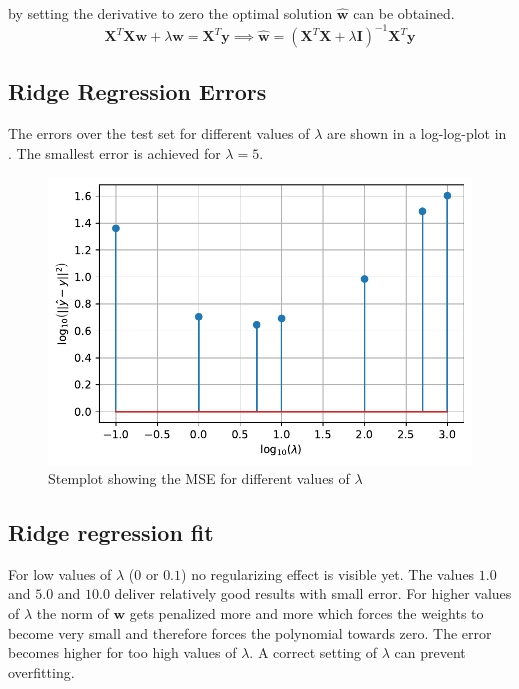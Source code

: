 \documentclass[12pt,a4paper]{scrartcl}
\newcommand{\matr}[1]{\mathbf{#1}}
\begin{document}
	by setting the derivative to zero the optimal solution $\hat{\matr{w}}$ can be obtained.
	\begin{equation}
		\matr{X}^T\matr{X}\matr{w} + \lambda \matr{w} = \matr{X}^T\matr{y} \implies \hat{\matr{w}} = (\matr{X}^T\matr{X} + \lambda \matr{I})^{-1} \matr{X}^T\matr{y}
	\end{equation}
	
	\subsection*{Ridge Regression Errors}
	
	The errors over the test set for different values of $\lambda$ are shown in a log-log-plot in . The smallest error is achieved for $\lambda = 5$.
	
	
	\begin{figure}[H]
		\centering	\includegraphics[width=0.85\linewidth]{figs/ex1_1_mse_lambda.pdf}
		\caption{Stemplot showing the MSE for different values of $\lambda$}
		\label{fig:ex1_1_mse_lambda}
	\end{figure}
	
	\subsection*{Ridge regression fit}
	
	For low values of $\lambda$ ($0$ or $0.1$) no regularizing effect is visible yet.
	The values $1.0$ and $5.0$ and $10.0$  deliver relatively good results with small error. For higher values of $\lambda$ the norm of $\matr{w}$ gets penalized more and more which forces the weights to become very small and therefore forces the polynomial towards zero. The error becomes higher for too high values of $\lambda$.
	A correct setting of $\lambda$ can prevent overfitting.
	
\end{document}
